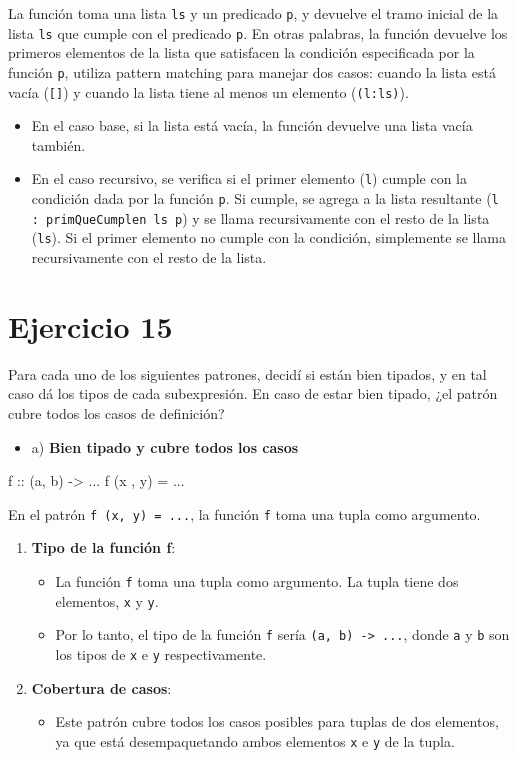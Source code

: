 \documentclass{article}
\begin{document}
    La función toma una lista \verb|ls| y un predicado \verb|p|, y devuelve el tramo inicial de la lista \verb|ls| que cumple con el predicado \verb|p|. En otras palabras, la función devuelve los primeros elementos de la lista que satisfacen la condición especificada por la función \verb|p|, utiliza pattern matching para manejar dos casos: cuando la lista está vacía (\verb|[]|) y cuando la lista tiene al menos un elemento (\verb|(l:ls)|).
    \begin{itemize}
    \item 
    En el caso base, si la lista está vacía, la función devuelve una lista vacía también.
    \item 
    En el caso recursivo, se verifica si el primer elemento (\verb|l|) cumple con la condición dada por la función \verb|p|. Si cumple, se agrega a la lista resultante (\verb|l : primQueCumplen ls p|) y se llama recursivamente con el resto de la lista (\verb|ls|). Si el primer elemento no cumple con la condición, simplemente se llama recursivamente con el resto de la lista.
\end{itemize}

\section*{Ejercicio 15}
Para cada uno de los siguientes patrones, decidí si están bien tipados, y en tal caso dá los tipos de cada subexpresión. En caso de estar bien tipado, ¿el patrón cubre todos los casos de deﬁnición?

\begin{itemize}
    \item 
    a) \textbf{Bien tipado y cubre todos los casos}
    \end{itemize}
\begin{haskell}
f :: (a, b) -> ... 
f (x , y) = ...
\end{haskell}
    
    En el patrón \verb|f (x, y) = ...|, la función \verb|f| toma una tupla como argumento.
    \begin{enumerate}
    \item 
    \textbf{Tipo de la función f}:
    \begin{itemize}
    \item 
    La función \verb|f| toma una tupla como argumento. La tupla tiene dos elementos, \verb|x| y \verb|y|.
    \item 
    Por lo tanto, el tipo de la función \verb|f| sería \verb|(a, b) -> ...|, donde \verb|a| y \verb|b| son los tipos de \verb|x| e \verb|y| respectivamente.
    \end{itemize}
    \item 
    \textbf{Cobertura de casos}:
    \begin{itemize}
    \item 
    Este patrón cubre todos los casos posibles para tuplas de dos elementos, ya que está desempaquetando ambos elementos \verb|x| e \verb|y| de la tupla.
    \end{itemize}
\end{enumerate}
    
\end{document}

